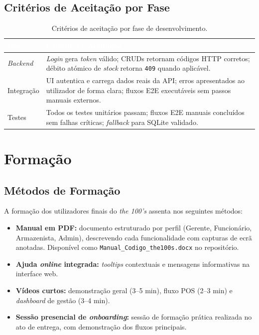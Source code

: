 \documentclass[11pt,a4paper]{report}
\begin{document}
\section{Critérios de Aceitação por Fase}

\begin{table}[H]
\centering\small
\begin{tabularx}{\textwidth}{L{2.5cm} X}
\toprule
{}
\textbf{\textcolor{white}{Fase}} & \textbf{\textcolor{white}{Critério de Aceitação}} \\
\midrule
\textit{Backend} & \textit{Login} gera \textit{token} válido; CRUDs retornam códigos HTTP corretos; débito atómico de \textit{stock} retorna \texttt{409} quando aplicável. \\
Integração & UI autentica e carrega dados reais da API; erros apresentados ao utilizador de forma clara; fluxos E2E executáveis sem passos manuais externos. \\
Testes & Todos os testes unitários passam; fluxos E2E manuais concluídos sem falhas críticas; \textit{fallback} para SQLite validado. \\
\bottomrule
\end{tabularx}
\caption{Critérios de aceitação por fase de desenvolvimento.}
\label{tab:aceitacao}
\end{table}

\chapter{Formação}\label{cap:formacao}

\section{Métodos de Formação}
A formação dos utilizadores finais do \textit{the 100's} assenta nos seguintes métodos:

\begin{itemize}
  \item \textbf{Manual em PDF:} documento estruturado por perfil (Gerente, Funcionário, Armazenista, Admin), descrevendo cada funcionalidade com capturas de ecrã anotadas. Disponível como \texttt{Manual\_Codigo\_the100s.docx} no repositório.
  \item \textbf{Ajuda \textit{online} integrada:} \textit{tooltips} contextuais e mensagens informativas na interface web.
  \item \textbf{Vídeos curtos:} demonstração geral (3--5 min), fluxo POS (2--3 min) e \textit{dashboard} de gestão (3--4 min).
  \item \textbf{Sessão presencial de \textit{onboarding}:} sessão de formação prática realizada no ato de entrega, com demonstração dos fluxos principais.
\end{itemize}
\end{document}
